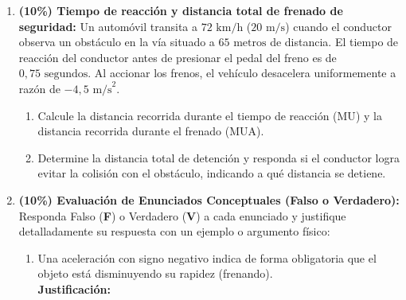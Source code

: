 \documentclass[11pt, letterpaper]{article}
\newif\ifmostrarrespuestas
\newcommand{\respuesta}[1]{
	\ifmostrarrespuestas
	\par\vspace{0.2cm}
	\begin{tcolorbox}[colback=blue!5!white, colframe=valblue, coltext=blue!80!black, boxrule=0.5pt, arc=1mm, left=2mm, right=2mm, top=1.5mm, bottom=1.5mm]
		\footnotesize \textbf{\textcolor{valblue}{Solución Paso a Paso (Docente):}} #1
	\end{tcolorbox}
	\vspace{0.2cm}
	\fi
}
\begin{document}
\begin{enumerate}[leftmargin=*, itemsep=0.6cm]
		\item \textbf{(10\%) Tiempo de reacción y distancia total de frenado de seguridad:} Un automóvil transita a $72\text{ km/h}$ ($20\text{ m/s}$) cuando el conductor observa un obstáculo en la vía situado a $65\text{ metros}$ de distancia. El tiempo de reacción del conductor antes de presionar el pedal del freno es de $0,75\text{ segundos}$. Al accionar los frenos, el vehículo desacelera uniformemente a razón de $-4,5\text{ m/s}^2$.
		\begin{enumerate}[label=\alph*., itemsep=0.2cm]
			\item Calcule la distancia recorrida durante el tiempo de reacción ($\text{MU}$) y la distancia recorrida durante el frenado ($\text{MUA}$).
			\item Determine la distancia total de detención y responda si el conductor logra evitar la colisión con el obstáculo, indicando a qué distancia se detiene.
		\end{enumerate}
		\respuesta{
			\textbf{a)} Distancia de reacción ($\text{MU}$): $x_{\text{reacción}} = v \cdot t_{\text{reacción}} = (20\text{ m/s})(0,75\text{ s}) = \mathbf{15}\text{ \textbf{m}}$.\\
			Distancia de frenado ($\text{MUA}$): Con $v_f^2 = v_0^2 + 2a x_{\text{frenado}} \implies 0^2 = 20^2 + 2(-4,5) x_{\text{frenado}} \implies 9 x_{\text{frenado}} = 400 \implies x_{\text{frenado}} = \mathbf{44,44}\text{ \textbf{m}}$.\\[0.1cm]
			\textbf{b)} Distancia total de detención: $x_{\text{total}} = 15 + 44,44 = \mathbf{59,44}\text{ \textbf{m}}$.\\
			Como $59,44\text{ m} < 65\text{ m}$, \textbf{sí logra evitar la colisión}, deteniéndose $65 - 59,44 = \mathbf{5,56}\text{ \textbf{metros}}$ antes del obstáculo.
		}
		
		\item \textbf{(10\%) Evaluación de Enunciados Conceptuales (Falso o Verdadero):} Responda Falso (\textbf{F}) o Verdadero (\textbf{V}) a cada enunciado y justifique detalladamente su respuesta con un ejemplo o argumento físico:
		\begin{enumerate}[label=\alph*., itemsep=0.3cm]
			\item \underline{\hspace{1.2cm}} Una aceleración con signo negativo indica de forma obligatoria que el objeto está disminuyendo su rapidez (frenando). \\[0.15cm]
			\textbf{Justificación:} \hrulefill \\[0.15cm] \mbox{}\hrulefill
			

\end{enumerate}
\end{enumerate}
\end{document}
